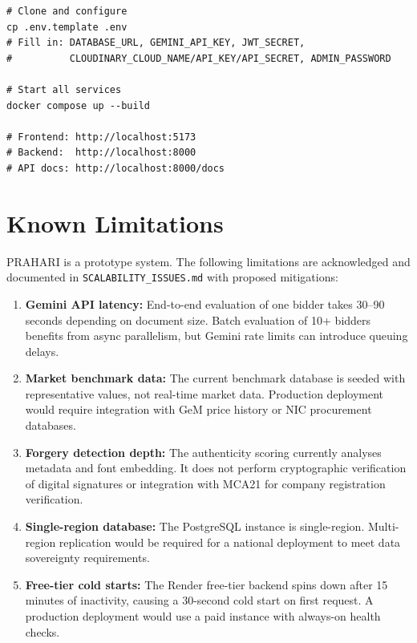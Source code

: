\documentclass[12pt,a4paper]{article}
\begin{document}
\begin{lstlisting}[style=bashstyle, caption={Docker local deployment}]
# Clone and configure
cp .env.template .env
# Fill in: DATABASE_URL, GEMINI_API_KEY, JWT_SECRET,
#          CLOUDINARY_CLOUD_NAME/API_KEY/API_SECRET, ADMIN_PASSWORD

# Start all services
docker compose up --build

# Frontend: http://localhost:5173
# Backend:  http://localhost:8000
# API docs: http://localhost:8000/docs
\end{lstlisting}

\section{Known Limitations}

PRAHARI is a prototype system. The following limitations are acknowledged and
documented in \texttt{SCALABILITY\_ISSUES.md} with proposed mitigations:

\begin{enumerate}
\item \textbf{Gemini API latency:} End-to-end evaluation of one bidder takes 30--90
    seconds depending on document size. Batch evaluation of 10+ bidders benefits
    from async parallelism, but Gemini rate limits can introduce queuing delays.

\item \textbf{Market benchmark data:} The current benchmark database is seeded with
    representative values, not real-time market data. Production deployment would
    require integration with GeM price history or NIC procurement databases.

\item \textbf{Forgery detection depth:} The authenticity scoring currently analyses
    metadata and font embedding. It does not perform cryptographic verification of
    digital signatures or integration with MCA21 for company registration verification.

\item \textbf{Single-region database:} The PostgreSQL instance is single-region.
    Multi-region replication would be required for a national deployment to meet
    data sovereignty requirements.

\item \textbf{Free-tier cold starts:} The Render free-tier backend spins down after
    15 minutes of inactivity, causing a 30-second cold start on first request.
    A production deployment would use a paid instance with always-on health checks.
\end{enumerate}
\end{document}
